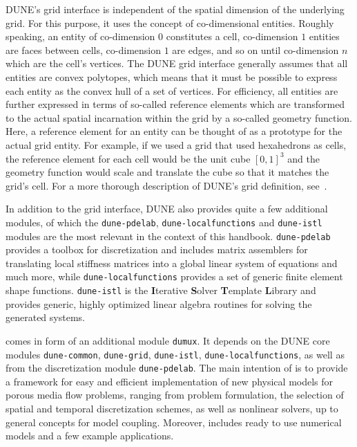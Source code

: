 DUNE's grid interface is independent of the spatial dimension of the
underlying grid. For this purpose, it uses the concept of
co-dimensional entities. Roughly speaking, an entity of co-dimension
$0$ constitutes a cell, co-dimension $1$ entities are faces between
cells, co-dimension $1$ are edges, and so on until co-dimension $n$
which are the cell's vertices.  The DUNE grid interface generally
assumes that all entities are convex polytopes, which means that it
must be possible to express each entity as the convex hull of a set of
vertices. For efficiency, all entities are further expressed in terms
of so-called reference elements which are transformed to the actual
spatial incarnation within the grid by a so-called geometry
function. Here, a reference element for an
entity can be thought of as a prototype for the actual grid
entity. For example, if we used a grid that used hexahedrons as cells,
the reference element for each cell would be the unit cube $[0, 1]^3$
and the geometry function would scale and translate the cube so that
it matches the grid's cell. For a more thorough description of DUNE's
grid definition, see~\cite{BASTIAN2008}.

In addition to the grid interface, DUNE also provides quite a few
additional modules, of which the \texttt{dune-pdelab},
\texttt{dune-localfunctions} and \texttt{dune-istl} modules are the
most relevant in the context of this handbook.  \texttt{dune-pdelab}
provides a toolbox for discretization and includes matrix assemblers
for translating local stiffness matrices into a global linear system
of equations and much more, while \texttt{dune-localfunctions}
provides a set of generic finite element shape
functions. \texttt{dune-istl} is the \textbf{I}terative
\textbf{S}olver \textbf{T}emplate \textbf{L}ibrary and provides
generic, highly optimized linear algebra routines for solving the
generated systems.

\Dumux comes in form of an additional module \texttt{dumux}. 
It depends on the DUNE core modules 
\texttt{dune-common}, \texttt{dune-grid}, \texttt{dune-istl}, \texttt{dune-localfunctions}, as well as from 
the discretization module \texttt{dune-pdelab}. 
The main intention of \Dumux is to provide a framework for easy and efficient 
implementation of new physical models for porous media flow problems, 
ranging from problem formulation, the selection of 
spatial and temporal discretization schemes, as well as nonlinear solvers,  
up to general concepts for model coupling.  
Moreover, \Dumux includes ready to use numerical models and a few example applications. 

